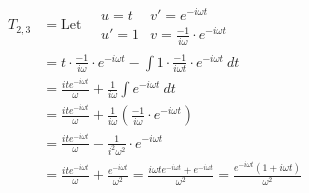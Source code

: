 \documentclass[preview]{standalone}
\begin{document}
\begin{align*}
T_{2,3}&= \textrm{Let} \quad \begin{array}{rl}u=t & v'=e^{-i\omega t} \\ u'=1 & v=\frac{-1}{i\omega}\cdot e^{-i\omega t} \end{array} \\ &=t\cdot \frac{-1}{i\omega}\cdot e^{-i\omega t}-\int 1\cdot \frac{-1}{i\omega t}\cdot e^{-i\omega t} \ dt \\ &=\frac{ite^{-i\omega t}}{\omega}+\frac{1}{i\omega}\int e^{-i\omega t} \ dt \\ &=\frac{ite^{-i\omega t}}{\omega}+\frac{1}{i\omega}\left(\frac{-1}{i\omega}\cdot e^{-i\omega t}\right) \\ &=\frac{ite^{-i\omega t}}{\omega}-\frac{1}{i^{2}\omega^{2}}\cdot e^{-i\omega t} \\ &=\frac{ite^{-i\omega t}}{\omega}+\frac{e^{-i\omega t}}{\omega^{2}} =\frac{i\omega t e^{-i\omega t}+e^{-i\omega t}}{\omega^{2}} =\frac{e^{-i\omega t}(1+i\omega t)}{\omega^{2}}
\end{align*}
\end{document}
